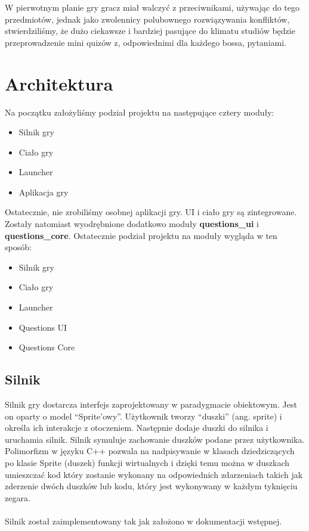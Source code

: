 \documentclass[12pt, titlepage]{article}
\begin{document}
W pierwotnym planie gry gracz miał
walczyć z przeciwnikami, używając do
tego przedmiotów, jednak jako zwolennicy
polubownego rozwiązywania konfliktów,
stwierdziliśmy, że dużo ciekawsze i
bardziej pasujące do klimatu studiów
będzie przeprowadzenie mini quizów
z, odpowiednimi dla każdego bossa,
pytaniami.

\newpage
\section{Architektura}
Na początku założyliśmy podział projektu
na następujące cztery moduły:
\begin{itemize}
	\item Silnik gry
	\item Ciało gry
	\item Launcher
	\item Aplikacja gry
\end{itemize}

\noindent
Ostatecznie, nie zrobiliśmy osobnej
aplikacji gry. UI i ciało gry są
zintegrowane. Zostały natomiast
wyodrębnione dodatkowo moduły
\textbf{questions\_ui} i
\textbf{questions\_core}.
Ostatecznie podział projektu na
moduły wygląda w ten sposób:
\begin{itemize}
	\item Silnik gry
	\item Ciało gry
	\item Launcher
	\item Questions UI
	\item Questions Core
\end{itemize}

\subsection{Silnik}
Silnik gry dostarcza interfejs zaprojektowany w
paradygmacie obiektowym. Jest on oparty o model
"`Sprite'owy"'. Użytkownik tworzy "`duszki"' (ang.
sprite) i określa ich interakcje z otoczeniem.
Następnie dodaje duszki do silnika i uruchamia
silnik. Silnik symuluje zachowanie duszków
podane przez użytkownika. Polimorfizm w języku C++
pozwala na
nadpisywanie w klasach dziedziczących po klasie
Sprite (duszek) funkcji wirtualnych i dzięki temu
można w duszkach umieszczać kod który zostanie
wykonany na odpowiednich zdarzeniach takich jak
zderzenie dwóch duszków lub kodu, który jest
wykonywany w każdym tyknięciu zegara.
\\~\\
Silnik został zaimplementowany tak jak założono
w dokumentacji wstępnej.
\end{document}
